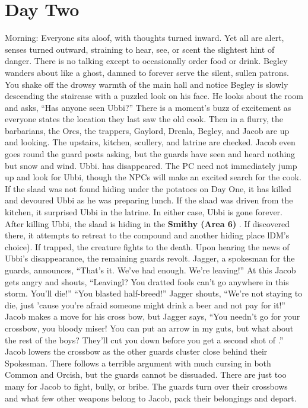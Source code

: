 \documentclass[a5paper,11pt,twoside]{book}
\newcommand{\MapText}[1]{
	{\color{DarkCyan} \textbf{#1}}
}
\newcommand{\firstLetter}[1]{\lettrine[loversize=0.3,
lines=3,
slope=-0.1em,
nindent=5pt,
lhang=0.35]{#1}
}
\begin{document}
{{{{{\chapter{Day Two}
\firstLetter{M}orning: Everyone sits aloof, with thoughts turned inward.
Yet all are alert, senses turned outward, straining to hear, see, or scent the slightest hint of danger.
There is no talking except to occasionally order food or drink.
Begley wanders about like a ghost, damned to forever serve the silent, sullen patrons.
You shake off the drowsy warmth of the main hall and notice Begley is slowly descending the staircase with a puzzled look on his face.
He looks about the room and asks, “Has anyone seen Ubbi?” There is a moment’s buzz of excitement as everyone states the location they last saw the old cook.
Then in a flurry, the barbarians, the Orcs, the trappers, Gaylord, Drenla, Begley, and Jacob are up and looking.
The upstairs, kitchen, scullery, and latrine are checked.
Jacob even goes round the guard posts asking, but the guards have seen and heard nothing but snow and wind.
Ubbi.
has disappeared.
The PC need not immediately jump up and look for Ubbi, though the NPCs will make an excited search for the cook.
If the slaad was not found hiding under the potatoes on Day One, it has killed and devoured Ubbi as he was preparing lunch.
If the slaad was driven from the kitchen, it surprised Ubbi in the latrine.
In either case, Ubbi is gone forever.
After killing Ubbi, the slaad is hiding in the \MapText{Smithy (Area 6)}.
If discovered there, it attempts to retreat to the compound and another hiding place lDM’s choice).
If trapped, the creature fights to the death.
 Upon hearing the news of Ubbi’s disappearance, the remaining guards revolt.
Jagger, a spokesman for the guards, announces, “That’s it.
We’ve had enough.
We’re leaving!” At this Jacob gets angry and shouts, “Leavingl? You dratted fools can’t go anywhere in this storm.
You’ll die!” “You blasted half-breed!” Jagger shouts, “We’re not staying to die, just ’cause you’re afraid someone might drink a beer and not pay for it!” Jacob makes a move for his cross bow, but Jagger says, “You needn’t go for your crossbow, you bloody miser! You can put an arrow in my guts, but what about the rest of the boys? They’ll cut you down before you get a second shot of .” Jacob lowers the crossbow as the other guards cluster close behind their Spokesman.
There follows a terrible argument with much cursing in both Common and Orcish, but the guards cannot be dissuaded.
There are just too many for Jacob to fight, bully, or bribe.
The guards turn over their crossbows and what few other weapons belong to Jacob, pack their belongings and depart.
}}}}}
\end{document}
